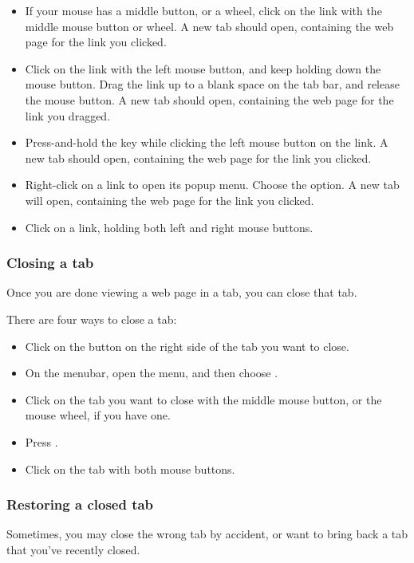 \begin{itemize}
  \item If your mouse has a middle button, or a wheel, click on the link with 
the middle mouse button or wheel. A new tab should open, containing the web
page for the link you clicked.
  \item Click on the link with the left mouse button, and keep holding down 
the mouse button. Drag the link up to a blank space on the tab bar, and release
the mouse button. A new tab should open, containing the web page for the link
you dragged.
  \item Press-and-hold the  key while clicking the left mouse 
button on the link. A new tab should open, containing the web page for the link
you clicked.
  \item Right-click on a link to open its popup menu. Choose the
 option. A new tab will open, containing
the web page for the link you clicked.
  \item Click on a link, holding both left and right mouse buttons.
\end{itemize} 

\subsubsection{Closing a tab}

Once you are done viewing a web page in a tab, you can close that tab. 

There are four ways to close a tab:

\begin{itemize}
  \item Click on the  button on the right side of the tab 
you want to close.
  \item On the menubar, open the  menu, and then choose 
.
  \item Click on the tab you want to close with the middle mouse button, or the
mouse wheel, if you have one.
  \item Press .
  \item Click on the tab with both mouse buttons.
\end{itemize}

\subsubsection{Restoring a closed tab}

Sometimes, you may close the wrong tab by accident, or want to bring back a tab that you've recently closed.

